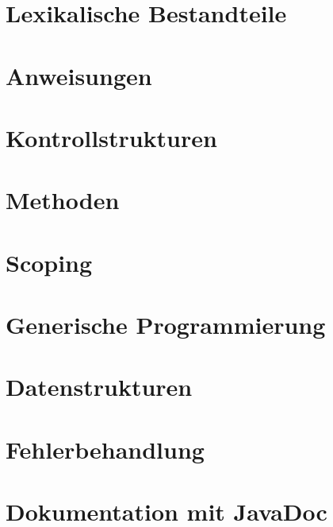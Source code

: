 \section{Lexikalische Bestandteile}
	

\section{Anweisungen}
	

\section{Kontrollstrukturen}
	

\section{Methoden}
	

\section{Scoping}
	

\section{Generische Programmierung}
	

\section{Datenstrukturen}
	

\section{Fehlerbehandlung}
	

\section{Dokumentation mit JavaDoc}
	
